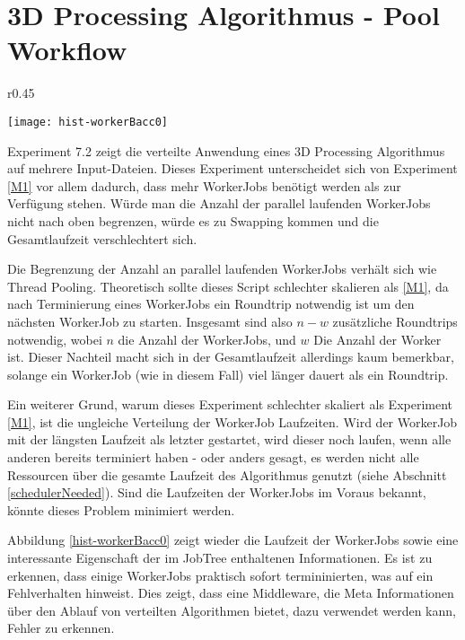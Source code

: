 \clearpage
\section{3D Processing Algorithmus - Pool Workflow}
\label{M2}

\begin{wrapfigure}{r}{0.45\textwidth}
  \vspace{-30pt}
  \begin{center}
    \texttt{[image: hist-workerBacc0]}
    \caption{Experiment \ref{M2} WorkerJob Laufzeiten aller 25 Iterationen in 50bins.}
    \label{hist-workerBacc0}
  \end{center}
\end{wrapfigure}

Experiment 7.2 zeigt die verteilte Anwendung eines 3D Processing Algorithmus auf mehrere Input-Dateien.
Dieses Experiment unterscheidet sich von Experiment \ref{M1} vor allem dadurch, dass mehr WorkerJobs benötigt werden als zur Verfügung stehen.
Würde man die Anzahl der parallel laufenden WorkerJobs nicht  nach oben begrenzen, würde es zu Swapping kommen und die Gesamtlaufzeit verschlechtert sich.

Die Begrenzung der Anzahl an parallel laufenden WorkerJobs verhält sich wie Thread Pooling.
Theoretisch sollte dieses Script schlechter skalieren als \ref{M1}, da nach Terminierung eines WorkerJobs ein Roundtrip notwendig ist um den nächsten WorkerJob zu starten.
Insgesamt sind also $n - w$ zusätzliche Roundtrips notwendig, wobei $n$ die Anzahl der WorkerJobs, und $w$ Die Anzahl der Worker ist.
Dieser Nachteil macht sich in der Gesamtlaufzeit allerdings kaum bemerkbar, solange ein WorkerJob (wie in diesem Fall) viel länger dauert als ein Roundtrip.

Ein weiterer Grund, warum dieses Experiment schlechter skaliert als Experiment \ref{M1}, ist die ungleiche Verteilung der WorkerJob Laufzeiten.
Wird der WorkerJob mit der längsten Laufzeit als letzter gestartet, wird dieser noch laufen, wenn alle anderen bereits terminiert haben
- oder anders gesagt, es werden nicht alle Ressourcen über die gesamte Laufzeit des Algorithmus genutzt (siehe Abschnitt \ref{schedulerNeeded}).
Sind die Laufzeiten der WorkerJobs im Voraus bekannt, könnte dieses Problem minimiert werden.

Abbildung \ref{hist-workerBacc0} zeigt wieder die Laufzeit der WorkerJobs sowie eine interessante Eigenschaft der im  JobTree enthaltenen Informationen.
Es ist zu erkennen, dass einige WorkerJobs praktisch sofort termininierten, was auf ein Fehlverhalten hinweist.
Dies zeigt, dass eine Middleware, die Meta Informationen über den Ablauf von verteilten Algorithmen bietet, dazu verwendet werden kann, Fehler zu erkennen.


